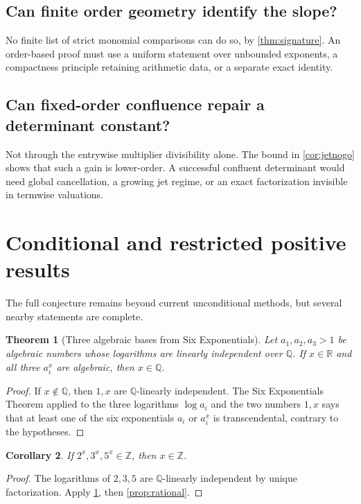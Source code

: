 \documentclass[11pt,oneside]{article}
\newtheorem{theorem}{Theorem}[section]
\newtheorem{corollary}[theorem]{Corollary}
\theoremstyle{definition}
\theoremstyle{remark}
\newcommand{\Z}{\mathbb Z}
\newcommand{\Q}{\mathbb Q}
\newcommand{\R}{\mathbb R}
\begin{document}
\subsection{Can finite order geometry identify the slope?}

No finite list of strict monomial comparisons can do so, by
\cref{thm:signature}.  An order-based proof must use a uniform statement over
unbounded exponents, a compactness principle retaining arithmetic data, or a
separate exact identity.

\subsection{Can fixed-order confluence repair a determinant constant?}

Not through the entrywise multiplier divisibility alone.  The bound in
\cref{cor:jetnogo} shows that such a gain is lower-order.  A successful
confluent determinant would need global cancellation, a growing jet regime,
or an exact factorization invisible in termwise valuations.

\section{Conditional and restricted positive results}

The full conjecture remains beyond current unconditional methods, but several
nearby statements are complete.

\begin{theorem}[Three algebraic bases from Six Exponentials]
\label{thm:sixexp}
Let $a_1,a_2,a_3>1$ be algebraic numbers whose logarithms are linearly
independent over $\Q$.  If $x\in\R$ and all three $a_i^x$ are algebraic, then
$x\in\Q$.
\end{theorem}

\begin{proof}
If $x\notin\Q$, then $1,x$ are $\Q$-linearly independent.  The Six
Exponentials Theorem applied to the three logarithms $\log a_i$ and the two
numbers $1,x$ says that at least one of the six exponentials
$a_i$ or $a_i^x$ is transcendental, contrary to the hypotheses.
\end{proof}

\begin{corollary}
If $2^x,3^x,5^x\in\Z$, then $x\in\Z$.
\end{corollary}

\begin{proof}
The logarithms of $2,3,5$ are $\Q$-linearly independent by unique
factorization.  Apply \cref{thm:sixexp}, then \cref{prop:rational}.
\end{proof}
\end{document}
